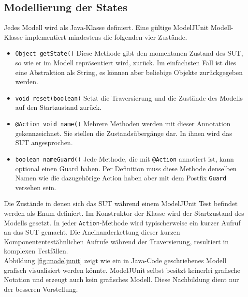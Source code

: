 \subsection{Modellierung der States}
Jedes Modell wird als Java-Klasse definiert. Eine gültige ModelJUnit Modell-Klasse implementiert mindestens die folgenden vier Zustände. 

\begin{itemize}
\item \texttt{Object getState()} Diese Methode gibt den momentanen Zustand des SUT, so wie er im Modell repräsentiert wird, zurück. Im einfachsten Fall ist dies eine Abstraktion als String, es können aber beliebige Objekte zurückgegeben werden.
\item \texttt{void reset(boolean)} Setzt die Traversierung und die Zustände des Modells auf den Startzustand zurück.
\item \texttt{@Action void name()} Mehrere Methoden werden mit dieser Annotation gekennzeichnet. Sie stellen die Zustandsübergänge dar. In ihnen wird das \Gls{SUT} angesprochen.
\item \texttt{boolean nameGuard()} Jede Methode, die mit \texttt{@Action} annotiert ist, kann optional einen Guard haben. Per Definition muss diese Methode denselben Namen wie die dazugehörige Action haben aber mit dem Postfix \texttt{Guard} versehen sein.
\end{itemize}

Die Zustände in denen sich das \Gls{SUT} während einem ModelJUnit Test befindet werden als Enum definiert. Im Konstruktor der Klasse wird der Startzustand des Modells gesetzt. In jeder \texttt{Action}-Methode wird typischerweise ein kurzer Aufruf an das \Gls{SUT} gemacht. Die Aneinanderkettung dieser kurzen Komponententestähnlichen Aufrufe während der Traversierung, resultiert in komplexen Testfällen.\\
Abbildung \ref{fig:modeljunit} zeigt wie ein in Java-Code geschriebenes Modell grafisch visualisiert werden könnte.  ModelJUnit selbst besitzt keinerlei grafische Notation und erzeugt auch kein grafisches Modell. Diese Nachbildung dient nur der besseren Vorstellung.


